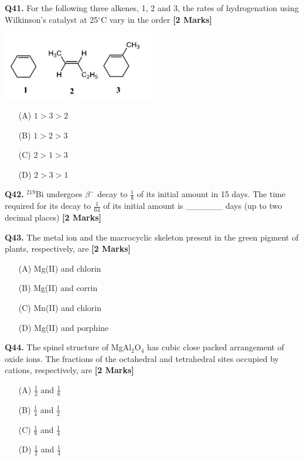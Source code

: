 \documentclass[11pt]{article}
\newcommand{\questionb}[2]{
    \noindent\textbf{Q#2.} #1 \hfill \textbf{[2 Marks]}
}
\begin{document}
\questionb{For the following three alkenes, 1, 2 and 3, the rates of hydrogenation using Wilkinson's catalyst at 25\(^\circ\)C vary in the order}{41}
\begin{center}
\includegraphics[width=0.5\textwidth]{figures/41.png}
\end{center}
\begin{enumerate}
    \item[(A)] $1 > 3 > 2$
    \item[(B)] $1 > 2 > 3$
    \item[(C)] $2 > 1 > 3$
    \item[(D)] $2 > 3 > 1$
\end{enumerate}
\vspace{0.5cm}

\questionb{\(^{219}\)Bi undergoes \(\beta^-\) decay to \(\frac{1}{8}\) of its initial amount in 15 days. The time required for its decay to \(\frac{1}{64}\) of its initial amount is \_\_\_\_\_\_ days (up to two decimal places)}{42}
\vspace{0.5cm}

\questionb{The metal ion and the macrocyclic skeleton present in the green pigment of plants, respectively, are}{43}
\begin{enumerate}
    \item[(A)] Mg(II) and chlorin
    \item[(B)] Mg(II) and corrin
    \item[(C)] Mn(II) and chlorin
    \item[(D)] Mg(II) and porphine
\end{enumerate}
\vspace{0.5cm}

\questionb{The spinel structure of MgAl\(_2\)O\(_4\) has cubic close packed arrangement of oxide ions. The fractions of the octahedral and tetrahedral sites occupied by cations, respectively, are}{44}
\begin{enumerate}
    \item[(A)] \(\frac{1}{2}\) and \(\frac{1}{8}\)
    \item[(B)] \(\frac{1}{4}\) and \(\frac{1}{2}\)
    \item[(C)] \(\frac{1}{8}\) and \(\frac{1}{4}\)
    \item[(D)] \(\frac{1}{2}\) and \(\frac{1}{4}\)
\end{enumerate}
\vspace{0.5cm}
\end{document}

